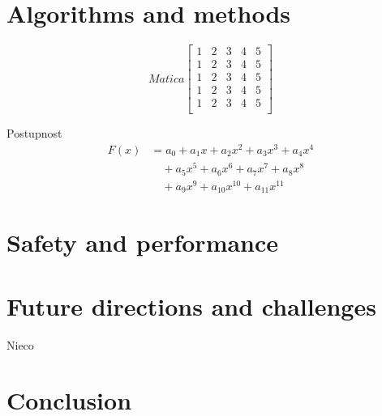 \documentclass[10pt,oneside,english,a4paper]{article}
\begin{document}
\section{Algorithms and methods} \label{dolezita}



\[Matica
\begin{bmatrix}
1 & 2 & 3 & 4 & 5\\
1 & 2 & 3 & 4 & 5\\
1 & 2 & 3 & 4 & 5\\
1 & 2 & 3 & 4 & 5\\
1 & 2 & 3 & 4 & 5\\
\end{bmatrix}
\]

Postupnost
\begin{align}
    F(x) &= a_0 + a_1 x + a_2 x^2 + a_3 x^3 + a_4 x^4 \nonumber \\
         &\quad + a_5 x^5 + a_6 x^6 + a_7 x^7 + a_8 x^8 \nonumber \\
         &\quad + a_9 x^9 + a_{10} x^{10} + a_{11} x^{11} \nonumber
\end{align}

\section{Safety and performance} \label{dolezitejsia}




\section{Future directions and challenges} \label{dolezitejsia}

Nieco
\cite{8501581}
\cite{8457076}
\cite{9214125}
\cite{Khayyam2020}
\cite{YOGANANDHAN20203303}
\cite{electronics12153223}
\cite{s23063335}
\cite{9288755}
\cite{7368032}
\cite{8809661}

\section{Conclusion} \label{zaver} %





\newpage

\end{document}

